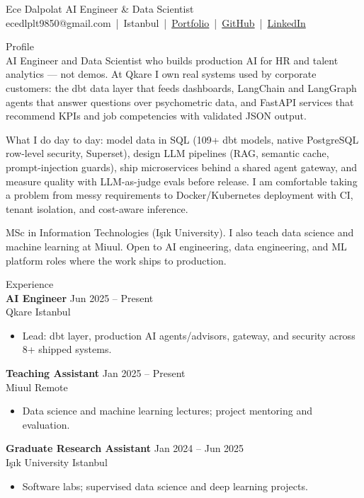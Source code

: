 \documentclass[11pt,a4paper]{article}
\newcommand{\cvsection}[1]{%
  \vspace{0.7em}%
  {\normalsize\fontseries{m}\selectfont #1}\\[0.25em]
}
\newcommand{\jobentry}[4]{%
  \textbf{#1} \hfill {\small #2}\\
  {\small #3} \hfill {\small #4}\\[0.2em]
}
\begin{document}
{\LARGE Ece Dalpolat} \hfill AI Engineer \& Data Scientist\\[0.35em]
{\small
ecedlplt9850@gmail.com \,|\, Istanbul \,|\,
\href{https://ecedalpolat.github.io/ece-dalpolat-portfolio/}{Portfolio} \,|\,
\href{https://github.com/EceDalpolat}{GitHub} \,|\,
\href{https://www.linkedin.com/in/ece-dalpolat-0265a0221/}{LinkedIn}
}

\cvsection{Profile}

AI Engineer and Data Scientist who builds production AI for HR and talent analytics --- not demos. At Qkare I own real systems used by corporate customers: the dbt data layer that feeds dashboards, LangChain and LangGraph agents that answer questions over psychometric data, and FastAPI services that recommend KPIs and job competencies with validated JSON output.

What I do day to day: model data in SQL (109+ dbt models, native PostgreSQL row-level security, Superset), design LLM pipelines (RAG, semantic cache, prompt-injection guards), ship microservices behind a shared agent gateway, and measure quality with LLM-as-judge evals before release. I am comfortable taking a problem from messy requirements to Docker/Kubernetes deployment with CI, tenant isolation, and cost-aware inference.

MSc in Information Technologies (Işık University). I also teach data science and machine learning at Miuul. Open to AI engineering, data engineering, and ML platform roles where the work ships to production.

\cvsection{Experience}

\jobentry{AI Engineer}{Jun 2025 -- Present}{Qkare}{Istanbul}
\begin{itemize}[leftmargin=1.2em, nosep, topsep=2pt]
  \item Lead: dbt layer, production AI agents/advisors, gateway, and security across 8+ shipped systems.
\end{itemize}

\jobentry{Teaching Assistant}{Jan 2025 -- Present}{Miuul}{Remote}
\begin{itemize}[leftmargin=1.2em, nosep, topsep=2pt]
  \item Data science and machine learning lectures; project mentoring and evaluation.
\end{itemize}

\jobentry{Graduate Research Assistant}{Jan 2024 -- Jun 2025}{Işık University}{Istanbul}
\begin{itemize}[leftmargin=1.2em, nosep, topsep=2pt]
  \item Software labs; supervised data science and deep learning projects.
\end{itemize}
\end{document}
